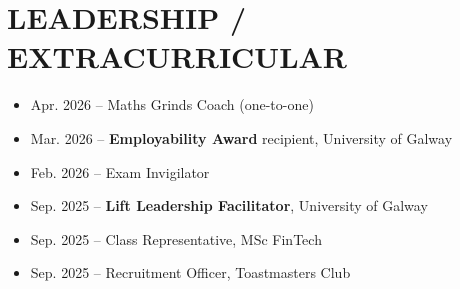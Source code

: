 \documentclass[letterpaper,11pt]{article}
\begin{document}
\section{LEADERSHIP / EXTRACURRICULAR}

\begin{itemize}[itemsep=1pt, parsep=1pt, before=\vspace{1pt}]
    \item Apr. 2026 -- Maths Grinds Coach (one-to-one)
    \item Mar. 2026 -- \textbf{Employability Award} recipient, University of Galway
    \item Feb. 2026 -- Exam Invigilator
    \item Sep. 2025 -- \textbf{Lift Leadership Facilitator}, University of Galway
    \item Sep. 2025 -- Class Representative, MSc FinTech
    \item Sep. 2025 -- Recruitment Officer, Toastmasters Club

\end{itemize}
\end{document}
